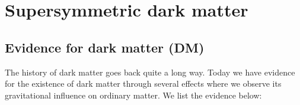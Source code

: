 \documentclass[notes.tex]{subfiles}
\begin{document}
\chapter{Supersymmetric dark matter}
\label{chap:dm}

\section{Evidence for dark matter (DM)}
The history of dark matter goes back quite a long way. Today we have evidence for the existence of dark matter through several effects where we observe its gravitational influence on ordinary matter.  We list the evidence below:
\end{document}
